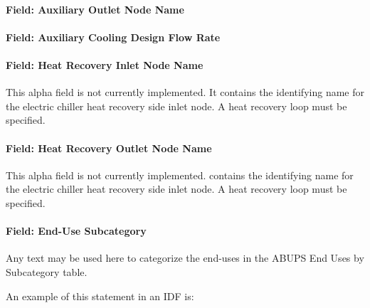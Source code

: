 \paragraph{Field: Auxiliary Outlet Node Name}\label{field-chiller205-auxiliary-outlet-node-name}

\paragraph{Field: Auxiliary Cooling Design Flow Rate}\label{field-chiller205-auxiliary-cooling-design-flow-rate}

\paragraph{Field: Heat Recovery Inlet Node Name}\label{field-chiller205-heat-recover-inlet-node-name}

This alpha field is not currently implemented. It contains the identifying name for the electric chiller heat recovery side inlet node. A heat recovery loop must be specified.

\paragraph{Field: Heat Recovery Outlet Node Name}\label{field-chiller205-heat-recovery-outlet-node-name}

This alpha field is not currently implemented. contains the identifying name for the electric chiller heat recovery side inlet node. A heat recovery loop must be specified.

\paragraph{Field: End-Use Subcategory}\label{field-chiller205-end-use-subcategory}

Any text may be used here to categorize the end-uses in the ABUPS End Uses by Subcategory table.

An example of this statement in an IDF is:


